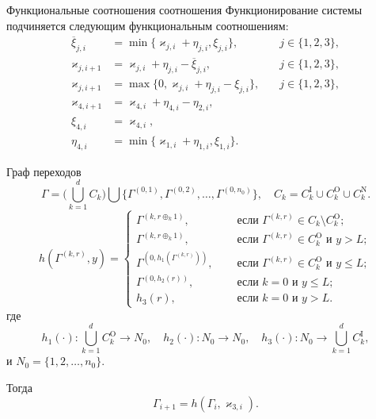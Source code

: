 \documentclass[10pt]{beamer}
\begin{document}
\begin{frame}{Функциональные соотношения соотношения}
Функционирование системы подчиняется следующим функциональным соотношениям:
\begin{align}
\overline{\xi}_{j,i}&=\min\{\varkappa_{j,i}+\eta_{j,i},\xi_{j,i}\}, \quad & j\in \{1,2,3\},\\
\varkappa_{j,i+1}&=\varkappa_{j,i}+\eta_{j,i}-\overline{\xi}_{j,i}, \quad & j\in \{1,2,3\},\\
\varkappa_{j,i+1}&=\max\{{0,\varkappa_{j,i}+\eta_{j,i}-\xi_{j,i}}\}, \quad & j\in \{1,2,3\},\\
\varkappa_{4,i+1}&=\varkappa_{4,i}+\eta_{4,i}-\eta_{2,i}, \quad &\\
\xi_{4,i} & = \varkappa_{4,i}, & \\
\eta_{4,i} & = \min\{ \varkappa_{1,i} + \eta_{1,i}, \xi_{1,i}\}.
\end{align}
\end{frame}


\begin{frame}{Граф переходов}
  \begin{equation}
  \Gamma = \bigl( \bigcup_{k=1}^d C_k \bigr) \bigcup \{\Gamma^{(0,1)}, \Gamma^{(0,2)}, \ldots, \Gamma^{(0,n_0)}\}, \quad C_k = C_k^{\mathrm{I}} \cup C_k^{\mathrm{O}}  \cup C_k^{\mathrm{N}}.
  \end{equation}
  \begin{equation}
h(\Gamma^{(k,r)},y) = 
\begin{cases}
\Gamma^{(k,r\oplus_k 1)},& \quad \text{ если } \Gamma^{(k,r)}\in C_k\setminus C_k^{\mathrm{O}};\\
\Gamma^{(k,r\oplus_k 1)},& \quad \text{ если } \Gamma^{(k,r)}\in C_k^{\mathrm{O}} \text{ и } y>L;\\
\Gamma^{(0,h_1(\Gamma^{(k,r)}))},& \quad \text{ если } \Gamma^{(k,r)}\in C_k^{\mathrm{O}} \text{ и } y\leqslant L;\\
\Gamma^{(0,h_2(r))},& \quad \text{ если } k=0 \text{ и } y\leqslant L;\\
h_3(r),& \quad \text{ если } k=0 \text{ и } y > L.
\end{cases}
\end{equation}
где 
$$h_1(\cdot)\colon \bigcup_{k=1}^d C_k^{\mathrm{O}}\to N_0, \quad h_2(\cdot)\colon N_0\to N_0, \quad h_3(\cdot)\colon N_0 \to\bigcup_{k=1}^d C_k^{\mathrm{I}},$$ и $N_0=\{1,2, \ldots, n_0\}$.

Тогда 
\begin{equation}
\Gamma_{i+1} = h(\Gamma_i, \varkappa_{3,i}).
\end{equation}
\end{frame}
\end{document}
